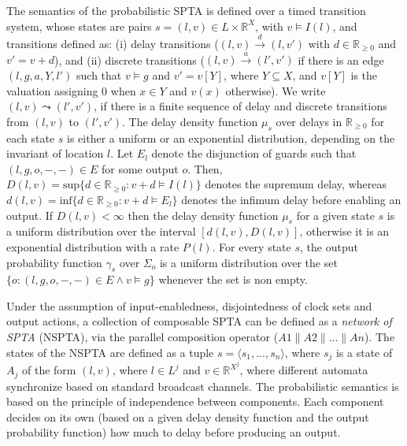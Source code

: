 The semantics of the probabilistic SPTA is defined over a timed transition system, whose states are pairs $s = (l,v) \in L \times \mathbb{R}^X$, with $v \models I(l)$, and transitions defined as:
(i) delay transitions ($(l, v)\xrightarrow{d}(l, v')$ with $d \in \mathbb{R}_{\geq 0}$ and $v'= v + d$), and
(ii) discrete transitions ($(l, v)\xrightarrow{a}(l', v')$ if there is an edge $(l,g,a,Y,l')$ such that $v \models g$ and $v'= v[Y]$, where $Y \subseteq X$, and $v[Y]$ is the valuation assigning 0 when $x \in Y$ and $v(x)$ otherwise).
We write $(l, v) \leadsto (l', v')$, if there is a finite sequence of delay and discrete transitions from $(l, v)$ to $(l', v')$. 
The delay density function $\mu_s$ over delays in $\mathbb{R}_{\geq 0}$ for each state $s$ is either a uniform or an exponential distribution, depending on the invariant of location $l$. Let $E_l$ denote the disjunction of guards such that $(l, g, o, -, -) \in E$ for some output $o$. Then, $D(l, v) = \mbox{sup}\{d \in \mathbb{R}_{\geq 0} : v + d \models I(l) \}$ denotes the supremum delay, whereas $d(l, v) = \mbox{inf}\{d \in \mathbb{R}_{\geq 0} : v + d \models  E_l \}$ denotes the infimum delay before enabling an output. If $D(l, v) < \infty$ then the delay density function $\mu_s$ for a given state $s$ is a uniform distribution over the interval $[d(l, v), D(l, v)]$, otherwise it is an exponential distribution with a rate $P(l)$. For every state $s$, the output probability function $\gamma_s$ over $\Sigma_o$ is a uniform distribution over the set $\{o : (l, g, o, -, -) \in E \land v \models g\}$ whenever the set is non empty. 

Under the assumption of input-enabledness, disjointedness of clock sets and output actions, a collection of composable SPTA can be defined as a  \textit{network of SPTA} (NSPTA), via the parallel composition operator ($A1\parallel A2 \parallel ... \parallel An$).
The states of the NSPTA are defined as a tuple $s = \langle s_1,...,s_n\rangle$, where $s_j$ is a state of $A_j$ of the form $(l, v)$, where $l \in L^j$ and $v \in \mathbb{R}^{X^j}$, where different automata synchronize based on standard broadcast channels. 
The probabilistic semantics is based on the principle of independence between components.
Each component decides on its own (based on a given delay density function and the output probability function) how much to delay before producing an output.

